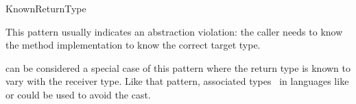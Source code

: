 \begin{pattern}{KnownReturnType}




\issues{}
This pattern usually indicates an abstraction violation: the caller 
needs to know the method implementation to know the correct target type.

 can be considered a special case of this
pattern where the return type is known to vary with the receiver type.
Like that pattern,
associated types~\cite{chakravartyAssociatedTypeSynonyms2005}
in languages like \haskell{} or \rust{} could be used to avoid the cast.

\end{pattern}
